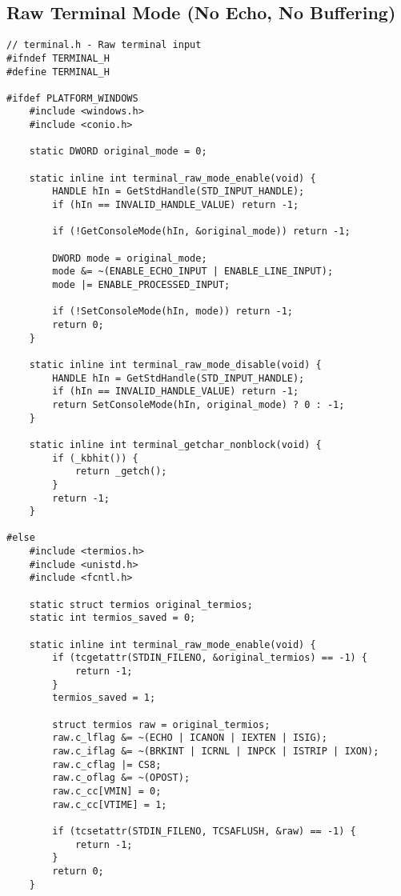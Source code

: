 \subsection{Raw Terminal Mode (No Echo, No Buffering)}

\begin{lstlisting}
// terminal.h - Raw terminal input
#ifndef TERMINAL_H
#define TERMINAL_H

#ifdef PLATFORM_WINDOWS
    #include <windows.h>
    #include <conio.h>

    static DWORD original_mode = 0;

    static inline int terminal_raw_mode_enable(void) {
        HANDLE hIn = GetStdHandle(STD_INPUT_HANDLE);
        if (hIn == INVALID_HANDLE_VALUE) return -1;

        if (!GetConsoleMode(hIn, &original_mode)) return -1;

        DWORD mode = original_mode;
        mode &= ~(ENABLE_ECHO_INPUT | ENABLE_LINE_INPUT);
        mode |= ENABLE_PROCESSED_INPUT;

        if (!SetConsoleMode(hIn, mode)) return -1;
        return 0;
    }

    static inline int terminal_raw_mode_disable(void) {
        HANDLE hIn = GetStdHandle(STD_INPUT_HANDLE);
        if (hIn == INVALID_HANDLE_VALUE) return -1;
        return SetConsoleMode(hIn, original_mode) ? 0 : -1;
    }

    static inline int terminal_getchar_nonblock(void) {
        if (_kbhit()) {
            return _getch();
        }
        return -1;
    }

#else
    #include <termios.h>
    #include <unistd.h>
    #include <fcntl.h>

    static struct termios original_termios;
    static int termios_saved = 0;

    static inline int terminal_raw_mode_enable(void) {
        if (tcgetattr(STDIN_FILENO, &original_termios) == -1) {
            return -1;
        }
        termios_saved = 1;

        struct termios raw = original_termios;
        raw.c_lflag &= ~(ECHO | ICANON | IEXTEN | ISIG);
        raw.c_iflag &= ~(BRKINT | ICRNL | INPCK | ISTRIP | IXON);
        raw.c_cflag |= CS8;
        raw.c_oflag &= ~(OPOST);
        raw.c_cc[VMIN] = 0;
        raw.c_cc[VTIME] = 1;

        if (tcsetattr(STDIN_FILENO, TCSAFLUSH, &raw) == -1) {
            return -1;
        }
        return 0;
    }


\end{lstlisting}
